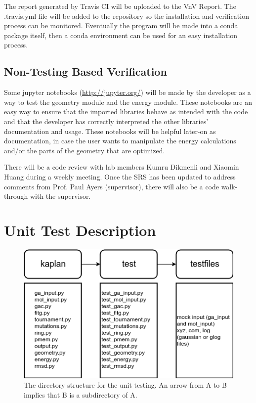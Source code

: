 \documentclass[12pt, titlepage]{article}
\begin{document}
The report generated by Travis CI will be uploaded to the VnV Report. The 
.travis.yml file will be added to the \progname{} repository so the 
installation and verification process can be monitored. Eventually the program 
will be made into a conda package itself, then a conda environment can be used 
for an easy installation process.


\subsection{Non-Testing Based Verification}

Some jupyter notebooks (\url{http://jupyter.org/}) will be made by the 
developer as a way to test the geometry module and the energy module. These 
notebooks are an easy way to ensure that the imported libraries behave as 
intended with the \progname{} code and that the developer has correctly 
interpreted the other libraries' documentation and usage. These notebooks will 
be helpful later-on as documentation, in case the user wants to manipulate the 
energy calculations and/or the parts of the geometry that are optimized.

There will be a code review with lab members Kumru Dikmenli and Xiaomin Huang 
during a weekly meeting. Once the SRS has been updated to address comments from 
Prof. Paul Ayers (supervisor), there will also be a code walk-through with the 
supervisor.

\section{Unit Test Description}

\begin{figure}[H]
	\includegraphics[width=\textwidth]{directory-structure.png}
	\caption{The directory structure for the unit testing. An arrow from A to B 
		implies that B is a subdirectory of A.}
	\label{fig-dir-struct}
\end{figure}
\end{document}
